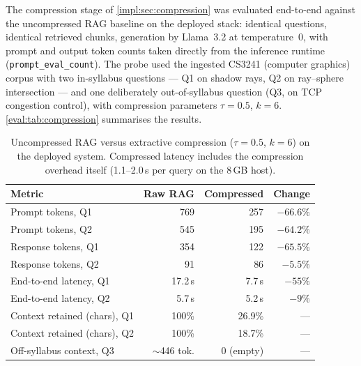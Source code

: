 The compression stage of \autoref{impl:sec:compression} was evaluated end-to-end
against the uncompressed RAG baseline on the deployed stack: identical questions,
identical retrieved chunks, generation by Llama~3.2 at temperature~0, with prompt
and output token counts taken directly from the inference runtime
(\texttt{prompt\_eval\_count}). The probe used the ingested CS3241 (computer
graphics) corpus with two in-syllabus questions --- Q1 on shadow rays, Q2 on
ray--sphere intersection --- and one deliberately out-of-syllabus question (Q3, on
TCP congestion control), with compression parameters $\tau = 0.5$, $k = 6$.
\autoref{eval:tab:compression} summarises the results.

\begin{table}[htb]
  \centering
  \caption{Uncompressed RAG versus extractive compression ($\tau=0.5$, $k=6$) on
           the deployed system. Compressed latency includes the compression
           overhead itself (1.1--2.0\,s per query on the 8\,GB host).}
  \label{eval:tab:compression}
  \begin{tabular}{l r r r}
    \hline
    \textbf{Metric} & \textbf{Raw RAG} & \textbf{Compressed} & \textbf{Change} \\
    \hline
    Prompt tokens, Q1            & 769            & 257           & $-66.6\%$ \\
    Prompt tokens, Q2            & 545            & 195           & $-64.2\%$ \\
    Response tokens, Q1          & 354            & 122           & $-65.5\%$ \\
    Response tokens, Q2          & 91             & 86            & $-5.5\%$  \\
    End-to-end latency, Q1       & 17.2\,s        & 7.7\,s        & $-55\%$   \\
    End-to-end latency, Q2       & 5.7\,s         & 5.2\,s        & $-9\%$    \\
    Context retained (chars), Q1 & 100\%          & 26.9\%        & ---       \\
    Context retained (chars), Q2 & 100\%          & 18.7\%        & ---       \\
    Off-syllabus context, Q3     & $\sim$446 tok. & 0 (empty)     & ---       \\
    \hline
  \end{tabular}
\end{table}

